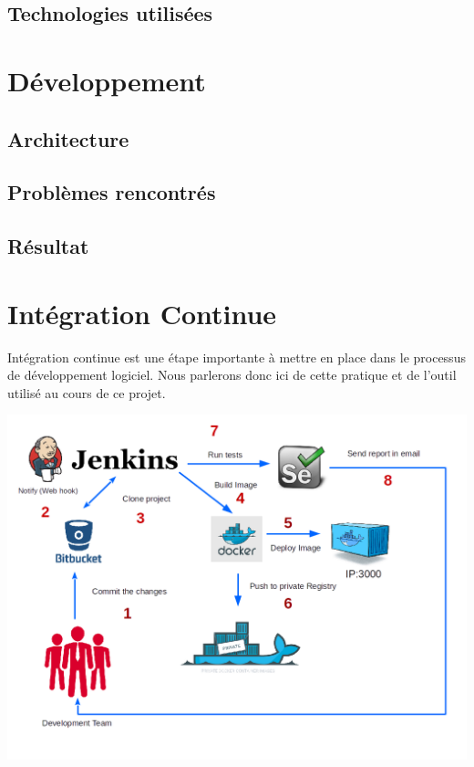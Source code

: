 \documentclass [a4paper,11pt]{article}
\begin{document}
\subsection{Technologies utilisées}

\newpage

\section{Développement}

\subsection{Architecture}

\subsection{Problèmes rencontrés}

\subsection{Résultat}


\newpage

\section{Intégration Continue}

Intégration continue est une étape importante à mettre en place dans le processus de développement logiciel. Nous parlerons donc ici de cette pratique et de l'outil utilisé au cours de ce projet.

\begin{center}
\includegraphics[scale=0.5]{img/ci.png}
\end{center}
\end{document}
